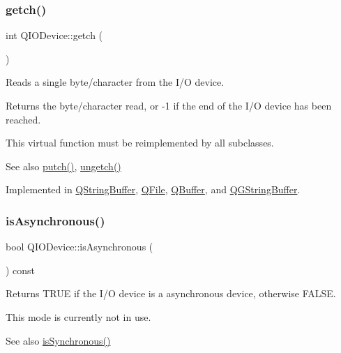 \subsubsection{\texorpdfstring{getch()}{getch()}}
{\footnotesize\ttfamily int Q\+I\+O\+Device\+::getch (\begin{DoxyParamCaption}{ }\end{DoxyParamCaption})\hspace{0.3cm}{\ttfamily [pure virtual]}}

Reads a single byte/character from the I/O device.

Returns the byte/character read, or -\/1 if the end of the I/O device has been reached.

This virtual function must be reimplemented by all subclasses.

\begin{DoxySeeAlso}{See also}
\mbox{\hyperlink{class_q_i_o_device_a5de5c1c1cba7ca36ba93289e30cd3029}{putch()}}, \mbox{\hyperlink{class_q_i_o_device_aae3d67422103e8fc0411297b1d62c29a}{ungetch()}} 
\end{DoxySeeAlso}


Implemented in \mbox{\hyperlink{class_q_string_buffer_acebe86e5beeaff3863673fc56089e2da}{Q\+String\+Buffer}}, \mbox{\hyperlink{class_q_file_a1c18e1a16e6f92ba8f19177824707f78}{Q\+File}}, \mbox{\hyperlink{class_q_buffer_abec634737e1d5a9b314e822737e51992}{Q\+Buffer}}, and \mbox{\hyperlink{class_q_g_string_buffer_a20699e4c4ba6d7d68c4422d795412751}{Q\+G\+String\+Buffer}}.

\mbox{\label{class_q_i_o_device_a95291c3aa671e64d41e4320190f05f4e}} 
\subsubsection{\texorpdfstring{isAsynchronous()}{isAsynchronous()}}
{\footnotesize\ttfamily bool Q\+I\+O\+Device\+::is\+Asynchronous (\begin{DoxyParamCaption}{ }\end{DoxyParamCaption}) const\hspace{0.3cm}{\ttfamily [inline]}}

Returns T\+R\+UE if the I/O device is a asynchronous device, otherwise F\+A\+L\+SE.

This mode is currently not in use.

\begin{DoxySeeAlso}{See also}
\mbox{\hyperlink{class_q_i_o_device_ac425c50bec523a8f6bccfbe2c1934f19}{is\+Synchronous()}} 
\end{DoxySeeAlso}
\mbox{\label{class_q_i_o_device_a643b4378bee07a7d8f6ab59dfd17df80}} 
